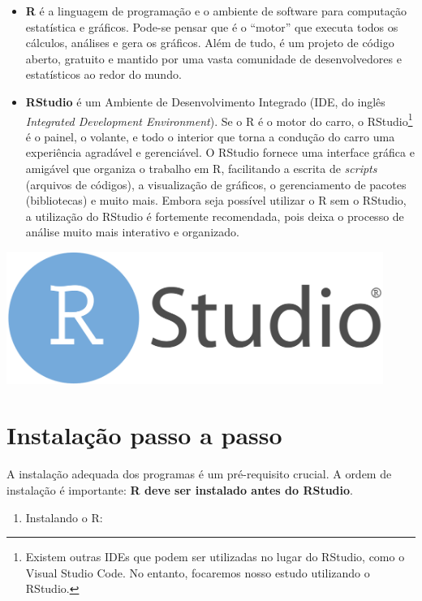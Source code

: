 \documentclass[
  12pt,
  letterpaper,
  DIV=11,
  numbers=noendperiod]{scrreprt}
\providecommand{\tightlist}{%
  \setlength{\itemsep}{0pt}\setlength{\parskip}{0pt}}\usepackage{longtable,booktabs,array}
\theoremstyle{definition}
\theoremstyle{exemplo}
\begin{document}
\begin{itemize}
\tightlist
\item
  \textbf{R} é a linguagem de programação e o ambiente de software para
  computação estatística e gráficos. Pode-se pensar que é o ``motor''
  que executa todos os cálculos, análises e gera os gráficos. Além de
  tudo, é um projeto de código aberto, gratuito e mantido por uma vasta
  comunidade de desenvolvedores e estatísticos ao redor do mundo.
\item
  \textbf{RStudio} é um Ambiente de Desenvolvimento Integrado (IDE, do
  inglês \emph{Integrated Development Environment}). Se o R é o motor do
  carro, o RStudio\footnote{Existem outras IDEs que podem ser utilizadas
    no lugar do RStudio, como o Visual Studio Code. No entanto,
    focaremos nosso estudo utilizando o RStudio.} é o painel, o volante,
  e todo o interior que torna a condução do carro uma experiência
  agradável e gerenciável. O RStudio fornece uma interface gráfica e
  amigável que organiza o trabalho em R, facilitando a escrita de
  \emph{scripts} (arquivos de códigos), a visualização de gráficos, o
  gerenciamento de pacotes (bibliotecas) e muito mais. Embora seja
  possível utilizar o R sem o RStudio, a utilização do RStudio é
  fortemente recomendada, pois deixa o processo de análise muito mais
  interativo e organizado.
\end{itemize}

\begin{center}
\includegraphics[width=4.83333in,height=\textheight]{images/rstudio.png}
\end{center}

\section{Instalação passo a passo}\label{instalauxe7uxe3o-passo-a-passo}

A instalação adequada dos programas é um pré-requisito crucial. A ordem
de instalação é importante: \textbf{R deve ser instalado antes do
RStudio}.

\begin{enumerate}
\def\labelenumi{\arabic{enumi}.}
\tightlist
\item
  Instalando o R:
\end{enumerate}
\end{document}
